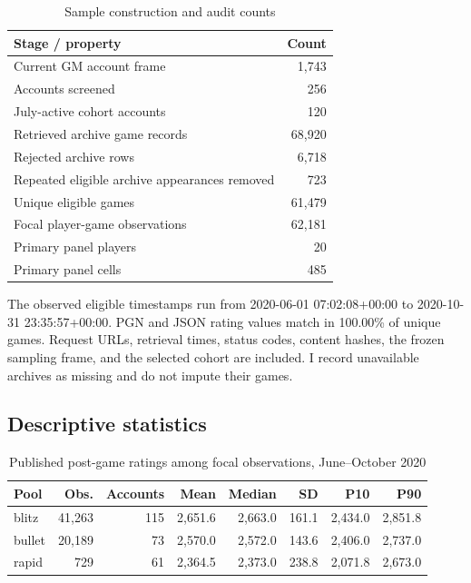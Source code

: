 \documentclass[11pt,a4paper]{article}
\begin{document}
\begin{table}[H]\centering\small\caption{Sample construction and audit counts}\begin{tabular}{lr}\toprule

Stage / property & Count \\ \midrule

Current GM account frame & 1,743 \\

Accounts screened & 256 \\

July-active cohort accounts & 120 \\

Retrieved archive game records & 68,920 \\

Rejected archive rows & 6,718 \\

Repeated eligible archive appearances removed & 723 \\

Unique eligible games & 61,479 \\

Focal player-game observations & 62,181 \\

Primary panel players & 20 \\

Primary panel cells & 485 \\

\bottomrule\end{tabular}\end{table}

The observed eligible timestamps run from 2020-06-01 07:02:08+00:00 to 2020-10-31 23:35:57+00:00. PGN and JSON rating values match in 100.00\% of unique games. Request URLs, retrieval times, status codes, content hashes, the frozen sampling frame, and the selected cohort are included. I record unavailable archives as missing and do not impute their games.

\subsection{Descriptive statistics}

\begin{table}[H]\centering\small\caption{Published post-game ratings among focal observations, June--October 2020}\begin{tabular}{lrrrrrrr}\toprule

Pool & Obs. & Accounts & Mean & Median & SD & P10 & P90 \\ \midrule

blitz & 41,263 & 115 & 2,651.6 & 2,663.0 & 161.1 & 2,434.0 & 2,851.8 \\

bullet & 20,189 & 73 & 2,570.0 & 2,572.0 & 143.6 & 2,406.0 & 2,737.0 \\

rapid & 729 & 61 & 2,364.5 & 2,373.0 & 238.8 & 2,071.8 & 2,673.0 \\

\bottomrule\end{tabular}\end{table}
\end{document}
